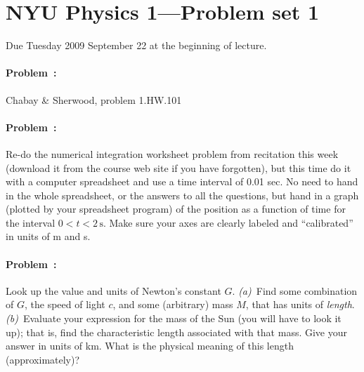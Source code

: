 \documentclass[12pt]{article}
\newcommand{\s}{\mathrm{s}}
\begin{document}
\thispagestyle{empty}

\section*{NYU Physics 1---Problem set 1}

Due Tuesday 2009 September 22 at the beginning of lecture.

\paragraph{Problem~\theproblem:}%
Chabay \& Sherwood, problem 1.HW.101

\paragraph{Problem~\theproblem:}%
Re-do the numerical integration worksheet problem from recitation this
week (download it from the course web site if you have forgotten), but
this time do it with a computer spreadsheet and use a time interval of
0.01 sec.  No need to hand in the whole spreadsheet, or the answers to
all the questions, but hand in a graph (plotted by your spreadsheet
program) of the position as a function of time for the interval
$0<t<2\,\s$.  Make sure your axes are clearly labeled and
``calibrated'' in units of m and s.

\paragraph{Problem~\theproblem:}%
Look up the value and units of Newton's constant $G$.
\textsl{(a)}~Find some combination of $G$, the speed of light $c$, and
some (arbitrary) mass $M$, that has units of \emph{length}.
\textsl{(b)}~Evaluate your expression for the mass of the Sun (you
will have to look it up); that is, find the characteristic length
associated with that mass.  Give your answer in units of km.  What is
the physical meaning of this length (approximately)?
\end{document}
